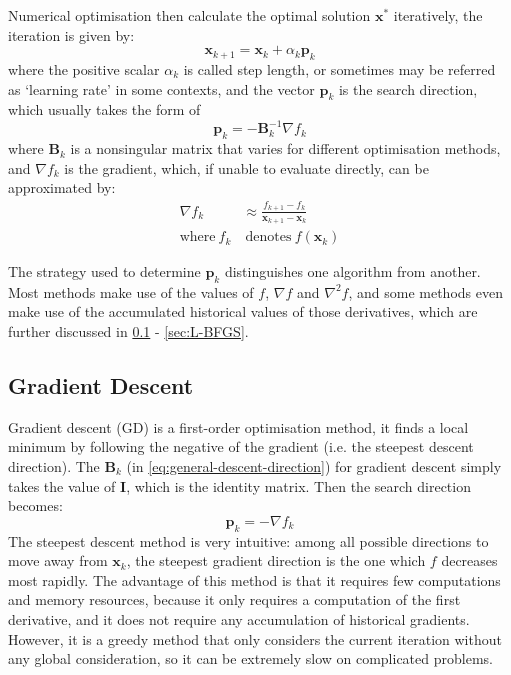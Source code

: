 Numerical optimisation then calculate the optimal solution $\textbf{x}^*$ iteratively, the iteration is given by:
\begin{equation}
  \textbf{x}_{k+1} = \textbf{x}_k+\alpha_k \textbf{p}_k
  \label{eq:optimisation_iteration}
\end{equation}
where the positive scalar $\alpha_k$ is called step length, or sometimes may be referred as `learning rate' in some contexts, and the vector $\textbf{p}_k$ is the search direction, which usually takes the form of
\begin{equation}
  \textbf{p}_k = -\textbf{B}_k^{-1} \nabla f_{k} \label{eq:general-descent-direction}
\end{equation}
where $\textbf{B}_k$ is a nonsingular matrix that varies for different optimisation methods, and $\nabla f_k$ is the gradient, which, if unable to evaluate directly, can be approximated by:
\begin{align}
  \nabla f_k         & \approx \frac{f_{k+1}-f_{k}}{\textbf{x}_{k+1}-\textbf{x}_{k}} \nonumber \\
  \text{where}\  f_k & \ \text{denotes}\  f(\textbf{x}_k)
\end{align}

The strategy used to determine $\textbf{p}_k$ distinguishes one algorithm from another. Most methods make use of the values of $f$, $\nabla f$ and $\nabla^2 f$, and some methods even make use of the accumulated historical values of those derivatives, which are further discussed in \cref{sec:GD} - \cref{sec:L-BFGS}.


\subsection{Gradient Descent}\label{sec:GD}
Gradient descent (GD) is a first-order optimisation method, it finds a local minimum by following the negative of the gradient (i.e. the steepest descent direction). The $\textbf{B}_k$ (in \cref{eq:general-descent-direction}) for gradient descent simply takes the value of $\textbf{I}$, which is the identity matrix. Then the search direction becomes:
\begin{equation}
  \textbf{p}_k = -\nabla f_k
\end{equation}
The steepest descent method is very intuitive: among all possible directions to move away from $\textbf{x}_{k}$, the steepest gradient direction is the one which $f$ decreases most rapidly. The advantage of this method is that it requires few computations and memory resources, because it only requires a computation of the first derivative, and it does not require any accumulation of historical gradients. However, it is a greedy method that only considers the current iteration without any global consideration, so it can be extremely slow on complicated problems. \cite{Nocedal2006}

